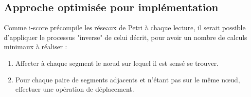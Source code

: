 \subsection{Approche optimisée pour implémentation}
Comme i-score précompile les réseaux de Petri à chaque lecture, il serait possible d'appliquer le processus "inverse" de celui décrit, pour avoir un nombre de calculs minimaux à réaliser : 

\begin{enumerate}
\item Affecter à chaque segment le nœud sur lequel il est sensé se trouver.
\item Pour chaque paire de segments adjacents et n'étant pas sur le même nœud, effectuer une opération de déplacement.
\end{enumerate}